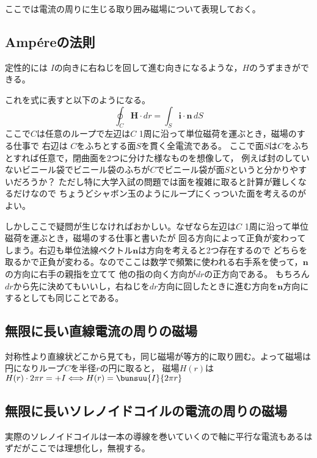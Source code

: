  ここでは電流の周りに生じる取り囲み磁場について表現しておく。

  \subsection{Amp\'{e}reの法則}

  定性的には%
  $I$の向きに右ねじを回して進む向きになるような，$H$のうずまきができる。

  これを式に表すと以下のようになる。
  $$\oint_C\bm H\cdot dr=\int_S\bm i\cdot\bm n\,dS$$
  ここで$C$は任意のループで左辺は$C$ 1周に沿って単位磁荷を運ぶとき，磁場のする仕事で
  右辺は%
  $C$をふちとする面$S$を貫く全電流である。
  ここで面$S$は$C$をふちとすれば任意で，閉曲面を2つに分けた様なものを想像して，
  例えば封のしていないビニール袋でビニール袋のふちが$C$でビニール袋が面$S$というと分かりやすいだろうか？
  ただし特に大学入試の問題では面を複雑に取ると計算が難しくなるだけなので
  ちょうどシャボン玉のようにループにくっついた面を考えるのがよい。

  しかしここで疑問が生じなければおかしい。なぜなら左辺は$C$ 1周に沿って単位磁荷を運ぶとき，磁場のする仕事と書いたが
  回る方向によって正負が変わってしまう。右辺も単位法線ベクトル$\bm n$は方向を考えると2つ存在するので
  どちらを取るかで正負が変わる。なのでここは数学で頻繁に使われる右手系を使って，$\bm n$の方向に右手の親指を立てて
  他の指の向く方向が$dr$の正方向である。
  もちろん$dr$から先に決めてもいいし，右ねじを$dr$方向に回したときに進む方向を$\bm n$方向にするとしても同じことである。

  \subsection{無限に長い直線電流の周りの磁場}

   対称性より直線状どこから見ても，同じ磁場が等方的に取り囲む。よって磁場は円になりループ$C$を半径$r$の円に取ると，
   磁場$H(r)$は$H(r)\cdot 2\pi r=+I\Longleftrightarrow H(r)=\bunsuu{I}{2\pi r}$

  \subsection{無限に長いソレノイドコイルの電流の周りの磁場}

  実際のソレノイドコイルは一本の導線を巻いていくので軸に平行な電流もあるはずだがここでは理想化し，無視する。

